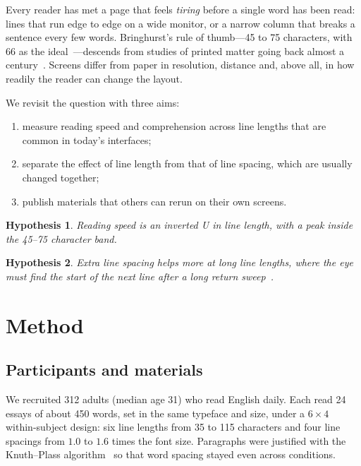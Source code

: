 \documentclass[11pt]{article}
\newtheorem{hypothesis}{Hypothesis}
\begin{document}
Every reader has met a page that feels \emph{tiring} before a single word has
been read: lines that run edge to edge on a wide monitor, or a narrow column that
breaks a sentence every few words. Bringhurst's rule of thumb---45 to 75
characters, with 66 as the ideal~\cite{bringhurst2004}---descends from studies of
printed matter going back almost a century~\cite{tinker1929}. Screens differ from
paper in resolution, distance and, above all, in how readily the reader can
change the layout.

We revisit the question with three aims:
\begin{enumerate}[label=(\roman*)]
  \item measure reading speed and comprehension across line lengths that are
        common in today's interfaces;
  \item separate the effect of line length from that of line spacing, which are
        usually changed together;
  \item publish materials that others can rerun on their own screens.
\end{enumerate}

\begin{hypothesis}
  \label{hyp:peak}
  Reading speed is an inverted U in line length, with a peak inside the
  45--75 character band.
\end{hypothesis}

\begin{hypothesis}
  \label{hyp:leading}
  Extra line spacing helps more at long line lengths, where the eye must find
  the start of the next line after a long return sweep~\cite{dyson2004}.
\end{hypothesis}

\section{Method}

\subsection{Participants and materials}
We recruited 312 adults (median age 31) who read English daily. Each read 24
essays of about 450 words, set in the same typeface and size, under a
$6 \times 4$ within-subject design: six line lengths from 35 to 115 characters
and four line spacings from $1.0$ to $1.6$ times the font size. Paragraphs were
justified with the Knuth--Plass algorithm~\cite{knuth1981} so that word spacing
stayed even across conditions.
\end{document}
